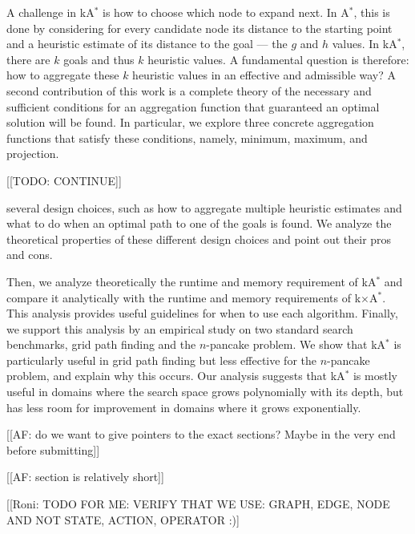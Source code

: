\documentclass[twoside,11pt]{article}
\newcommand{\astar}{A$^*$\xspace}
\newcommand{\kastar}{kA$^*$\xspace}
\newcommand{\kxastar}{k$\times$A$^*$\xspace}
\begin{document}
A challenge in \kastar is how to choose which node to expand next. 
In \astar{}, this is done by considering for every candidate node its distance to the starting point and a heuristic estimate of its distance to the goal --- the $g$ and $h$ values. In \kastar{}, there are $k$ goals and thus $k$ heuristic values. A fundamental question is therefore: how to aggregate these $k$ heuristic values in an effective and admissible way?
A second contribution of this work is a complete theory of the necessary and sufficient conditions for an aggregation function that guaranteed an optimal solution will be found. 
In particular, we explore three concrete aggregation functions that satisfy these conditions, namely, minimum, maximum, and projection. 


[[TODO: CONTINUE]]

several design choices, such as how to aggregate multiple heuristic estimates and what to do when an optimal path to one of the goals is found. 
We analyze the theoretical properties of these different design choices and point out their pros and cons.

Then, we analyze theoretically the runtime and memory requirement of \kastar and compare it analytically with the runtime and memory requirements of \kxastar.
This analysis provides useful guidelines for when to use each algorithm.
Finally, we support this analysis by an empirical study on two standard search benchmarks, grid path finding and the $n$-pancake problem. We show that \kastar{} is particularly useful in grid path finding but less effective for the $n$-pancake problem, and explain why this occurs. Our analysis suggests that \kastar{} is mostly useful in domains where the search space grows polynomially with its depth, but has less room for improvement in domains where it grows exponentially. 

[[AF: do we want to give pointers to the exact sections? Maybe in the very end before submitting]]

[[AF: section is relatively short]]

[[Roni: TODO FOR ME: VERIFY THAT WE USE:
GRAPH, EDGE, NODE
AND NOT STATE, ACTION, OPERATOR  :)]

\end{document}
